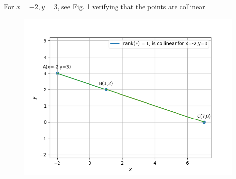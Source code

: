 \documentclass[12pt]{article}
\begin{document}
For $x=-2, y=3$, see Fig. \ref{fig:chapters/10/7/4/2Fig} verifying that the points are collinear.
\begin{figure}[!h]
	\begin{center} 
	    \includegraphics[width=\columnwidth]{chapters/10/7/4/2/figs/sc1.png}
	\end{center}
\caption{}
\label{fig:chapters/10/7/4/2Fig}
\end{figure}
\end{document}
